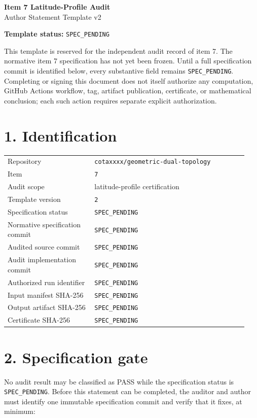 \documentclass[11pt]{article}
\newcommand{\specpending}{\texttt{SPEC\_PENDING}}
\begin{document}
\begin{center}
{\Large\bfseries Item 7 Latitude-Profile Audit}\\[4pt]
{\large Author Statement Template v2}
\end{center}

\noindent\textbf{Template status:} \specpending

\medskip
\noindent
This template is reserved for the independent audit record of item 7.  The
normative item 7 specification has not yet been frozen.  Until a full
specification commit is identified below, every substantive field remains
\specpending.  Completing or signing this document does not itself authorize
any computation, GitHub Actions workflow, tag, artifact publication,
certificate, or mathematical conclusion; each such action requires separate
explicit authorization.

\section*{1. Identification}

\begin{tabular}{>{\raggedright\arraybackslash}p{0.34\linewidth}p{0.60\linewidth}}
Repository & \texttt{cotaxxxx/geometric-dual-topology} \\
Item & \texttt{7} \\
Audit scope & latitude-profile certification \\
Template version & \texttt{2} \\
Specification status & \specpending \\
Normative specification commit & \specpending \\
Audited source commit & \specpending \\
Audit implementation commit & \specpending \\
Authorized run identifier & \specpending \\
Input manifest SHA-256 & \specpending \\
Output artifact SHA-256 & \specpending \\
Certificate SHA-256 & \specpending \\
\end{tabular}

\section*{2. Specification gate}

No audit result may be classified as PASS while the specification status is
\specpending.  Before this statement can be completed, the auditor and author
must identify one immutable specification commit and verify that it fixes, at
minimum:
\end{document}
